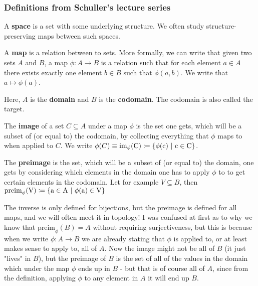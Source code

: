 \subsubsection*{Definitions from Schuller's lecture series} 
\begin{deff}
    A \textbf{space} is a set with some underlying structure. We often study structure-preserving maps between such spaces.
\end{deff}
\begin{deff}
    A \textbf{map} is a relation between to sets. More formally, we can write that given two sets \(A\) and \(B\), a map \(\phi : A \to B\) is a relation such that for each element \(a \in A\) there exists exactly one element \(b \in B\) such that \(\phi (a , b)\). We write that \(a \mapsto \phi(a)\).   
\end{deff}
\begin{deff}
    Here, \(A\) is the \textbf{domain} and \(B\) is the \textbf{codomain}. The codomain is also called the target.
\end{deff}
\begin{deff}
    The \textbf{image} of a set \(C \subseteq A\) under a map \(\phi\)  is the set one gets, which will be a subset of (or equal to) the codomain, by collecting everything that \(\phi \)  maps to when applied to \(C\). We write \(\phi (C) \equiv \rm{im}_\phi(C) \coloneqq \left\{ \phi (c)\ |\ c \in C \right\}\). 
\end{deff}
\begin{deff}
    The \textbf{preimage} is the set, which will be a subset of (or equal to) the domain, one gets by considering which elements in the domain one has to apply \(\phi \) to to get certain elements in the codomain. Let for example \(V \subseteq B\), then \(\rm{preim}_{\phi}(V) \coloneqq \left\{ a \in A\ | \  \phi (a) \in V\right\}  \)
\end{deff}
\begin{rem}
    The inverse is only defined for bijections, but the preimage is defined for all maps, and we will often meet it in topology! I was confused at first as to why we know that \(\text{preim}_{\phi }(B) = A\) without requiring surjectiveness, but this is because when we write \(\phi : A \to B\) we are already stating that \(\phi \) is applied to, or at least makes sense to apply to, all of \(A\). Now the image might not be all of \(B\) (it just "lives" in \(B\)), but the preimage of \(B\) is the set of all of the values in the domain which under the map \(\phi\) ends up in \(B\) - but that is of course all of \(A\), since from the definition, applying \(\phi\) to any element in \(A\) it will end up \(B\).     
\end{rem}
